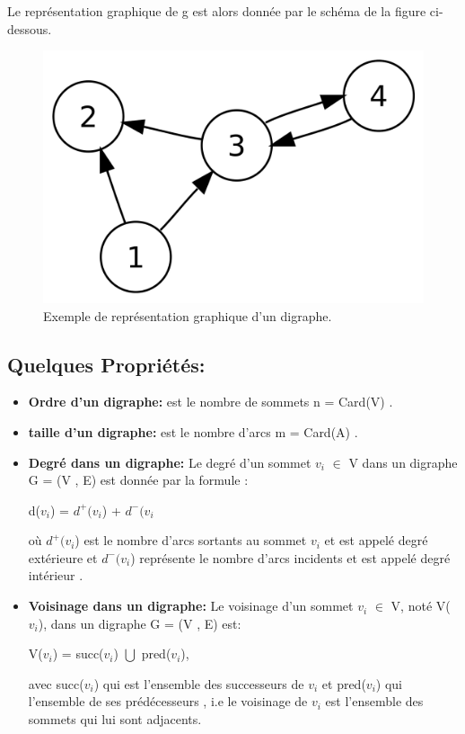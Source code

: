 		
		Le représentation graphique de g est alors donnée par le schéma de la figure ci-dessous.
		
		
			\begin{figure}[h]
			\includegraphics[scale=0.15,center]{./ressources/image/RepDiGraphe.png}
			\caption[Exemple de représentation graphique d'un digraphe.]{Exemple de représentation graphique d'un digraphe.}
			\end{figure}
			
		
		\subsection{Quelques Propriétés:} %
			\begin{itemize}[label=$\circ$]
			\item\textbf{Ordre d'un digraphe:}
			est le nombre de sommets n = Card(V) \citep{DUT}.
			
			\item\textbf{taille d'un digraphe:} est le nombre d’arcs m = Card(A) \citep{DUT}.
			
			\item\textbf{Degré dans un digraphe:}
			Le degré d'un sommet $v_{i}$ $\in$ V dans un digraphe G = (V , E) est donnée par la formule :
			\begin{center}
				d($v_{i}$) = $d^+(v_{i}$) + $d^-(v_{i}$\\
			\end{center}			 
			 où $d^+(v_{i}$) est le nombre d'arcs sortants au sommet $v_{i}$ et est appelé degré extérieure et $d^-(v_{i}$) représente le nombre d'arcs incidents et est appelé degré intérieur \citep{muller}.
			 
			 \item\textbf{Voisinage dans un digraphe:}
			 Le voisinage d'un sommet $v_{i}$ $\in$ V, noté V($v_{i}$), dans un digraphe G = (V , E) est:
			 	\begin{center}
				V($v_{i}$) = succ($v_{i}$) $\bigcup$ pred($v_{i}$),
				\end{center}
				
				 avec succ($v_{i}$) qui est l'ensemble des successeurs de $v_{i}$ et pred($v_{i}$) qui l'ensemble de ses prédécesseurs \citep{bac}, i.e le voisinage de $v_{i}$ est l'ensemble des sommets qui lui sont adjacents.
			
			\end{itemize}
			